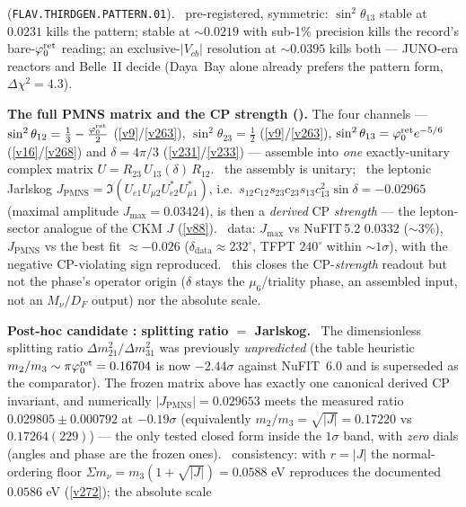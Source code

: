 (\texttt{FLAV.THIRDGEN.PATTERN.01}). \mX\ pre-registered, symmetric: $\sin^2\theta_{13}$ stable at $0.0231$ kills the
pattern; stable at ${\sim}0.0219$ with sub-1\% precision kills the record's bare-$\varphi_0^{\mathrm{ret}}$ reading; an exclusive-$|V_{cb}|$
resolution at ${\sim}0.0395$ kills both --- JUNO-era reactors and Belle~II decide (Daya~Bay alone already prefers the
pattern form, $\Delta\chi^2=4.3$).
\par\smallskip\noindent\textbf{The full PMNS matrix and the CP strength ().}
The four channels --- $\sin^2\theta_{12}=\tfrac13-\tfrac{\varphi_0^{\mathrm{ret}}}2$ (\vref{v9}/\vref{v263}),
$\sin^2\theta_{23}=\tfrac12$ (\vref{v9}/\vref{v263}), $\sin^2\theta_{13}=\varphi_0^{\mathrm{ret}} e^{-5/6}$ (\vref{v16}/\vref{v268})
and $\delta=4\pi/3$ (\vref{v231}/\vref{v233}) --- assemble into \emph{one} exactly-unitary complex matrix
$U=R_{23}\,U_{13}(\delta)\,R_{12}$. \mE\ the assembly is unitary; \mC\ the leptonic Jarlskog
$J_{\mathrm{PMNS}}=\Im(U_{e1}U_{\mu2}U_{e2}^{*}U_{\mu1}^{*})$, i.e.\
$s_{12}c_{12}s_{23}c_{23}s_{13}c_{13}^2\sin\delta=-0.02965$ (maximal amplitude $J_{\max}=0.03424$), is then a
\emph{derived} CP \emph{strength} --- the lepton-sector analogue of the CKM $J$ (\vref{v88}). \mC\ data: $J_{\max}$ vs NuFIT\,5.2 $0.0332$ ($\sim3\%$),
$J_{\mathrm{PMNS}}$ vs the best fit $\approx-0.026$ ($\delta_{\mathrm{data}}\approx232^\circ$, TFPT $240^\circ$
within $\sim1\sigma$), with the negative CP-violating sign reproduced. \mO\ this closes the CP-\emph{strength}
readout but not the phase's operator origin ($\delta$ stays the $\mu_6$/triality phase, an assembled input,
not an $M_\nu/D_F$ output) nor the absolute scale.
\par\smallskip\noindent\textbf{Post-hoc candidate \mO: splitting ratio $=$ Jarlskog.}
\veri{v468\_dm2\_ratio\_jarlskog.py}\
The dimensionless splitting ratio $\Delta m^2_{21}/\Delta m^2_{31}$ was previously \emph{unpredicted} (the table
heuristic $m_2/m_3\sim\pi\varphi_0^{\mathrm{ret}}=0.16704$ is now $-2.44\sigma$ against NuFIT~6.0 and is superseded as the comparator).
The frozen matrix above has exactly one canonical derived CP invariant, and numerically
$|J_{\mathrm{PMNS}}|=0.029653$ meets the measured ratio $0.029805\pm0.000792$ at $-0.19\sigma$ (equivalently
$m_2/m_3=\sqrt{|J|}=0.17220$ vs $0.17264(229)$) --- the only tested closed form inside the $1\sigma$ band, with
\emph{zero} dials (angles and phase are the frozen ones). \mC\ consistency: with $r=|J|$ the normal-ordering floor
$\Sigma m_\nu=m_3(1+\sqrt{|J|})=0.0588$ eV reproduces the documented $0.0586$ eV (\vref{v272}); the absolute scale
